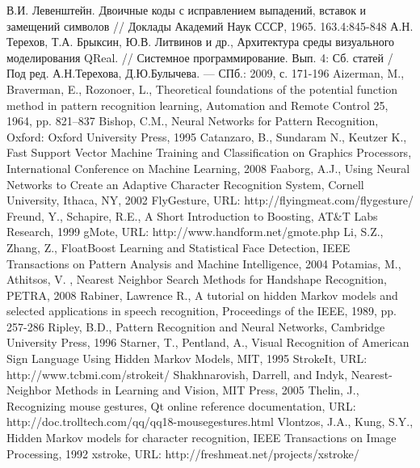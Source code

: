 \documentclass[a5paper]{article}
\begin{document}
\begin{thebibliography}{9000}
   В.И. Левенштейн. Двоичные коды с исправлением выпадений, вставок и замещений символов // Доклады Академий Наук СССР, 1965. 163.4:845-848
   А.Н. Терехов, Т.А. Брыксин, Ю.В. Литвинов и др., Архитектура среды визуального моделирования QReal. // Системное 
программирование. Вып. 4: Сб. статей / Под ред. А.Н.Терехова, Д.Ю.Булычева. --- СПб.: 2009, с. 171-196
   Aizerman, M., Braverman, E., Rozonoer, L., Theoretical foundations of the potential function method in pattern recognition learning, 
Automation and Remote Control 25, 1964, pp. 821–837
   Bishop, C.M., Neural Networks for Pattern Recognition, Oxford: Oxford University Press, 1995  
   Catanzaro, B., Sundaram N., Keutzer K., Fast Support Vector Machine Training and Classification on Graphics Processors, International 
Conference on Machine Learning, 2008
   Faaborg, A.J., Using Neural Networks to Create an Adaptive Character Recognition System, Cornell University, Ithaca, NY, 2002
   FlyGesture, URL: http://flyingmeat.com/flygesture/
   Freund, Y., Schapire, R.E., A Short Introduction to Boosting, AT\&T Labs Research, 1999
   gMote, URL: http://www.handform.net/gmote.php
   Li, S.Z., Zhang, Z., FloatBoost Learning and Statistical Face Detection, IEEE Transactions on Pattern Analysis and Machine Intelligence, 2004
   Potamias, M., Athitsos, V. , Nearest Neighbor Search Methods for Handshape Recognition, PETRA, 2008
   Rabiner, Lawrence R., A tutorial on hidden Markov models and selected applications in speech recognition, Proceedings of the IEEE, 1989, pp. 257-286
   Ripley, B.D., Pattern Recognition and Neural Networks, Cambridge University Press, 1996
   Starner, T., Pentland, A., Visual Recognition of American Sign Language Using Hidden Markov Models, MIT, 1995
   StrokeIt, URL: http://www.tcbmi.com/strokeit/  
   Shakhnarovish, Darrell, and Indyk, Nearest-Neighbor Methods in Learning and Vision, MIT Press, 2005
   Thelin, J., Recognizing mouse gestures, Qt online reference documentation, URL: http://doc.trolltech.com/qq/qq18-mousegestures.html 
   Vlontzos, J.A., Kung, S.Y., Hidden Markov models for character recognition, IEEE Transactions on Image Processing, 1992
   xstroke, URL: http://freshmeat.net/projects/xstroke/
\end{thebibliography}
  
\end{document}
